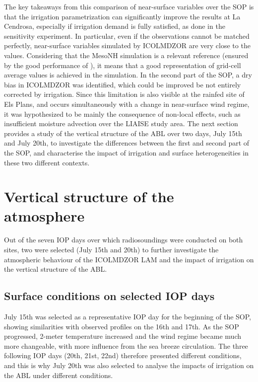 The key takeaways from this comparison of near-surface variables over the SOP is that the irrigation parametrization can significantly improve the results at La Cendrosa, especially if irrigation demand is fully satisfied, as done in the \irrboost sensitivity experiment.
In particular, even if the observations cannot be matched perfectly, near-surface variables simulated by ICOLMDZOR are very close to the \mesomean values. Considering that the MesoNH simulation is a relevant reference (ensured by the good performance of \mesoexact), it means that a good representation of grid-cell average values is achieved in the \irrboost simulation. 
In the second part of the SOP, a dry bias in ICOLMDZOR was identified, which could be improved be not entirely corrected by irrigation. Since this limitation is also visible at the rainfed site of Els Plans, and occurs simultaneously with a change in near-surface wind regime, it was hypothesized to be mainly the consequence of non-local effects, such as insufficient moisture advection over the LIAISE study area. The next section provides a study of the vertical structure of the ABL over two days, July 15th and July 20th, to investigate the differences between the first and second part of the SOP, and characterise the impact of irrigation and surface heterogeneities in these two different contexts.
\clearpage %

\section{Vertical structure of the atmosphere}
\label{sec:iop}

Out of the seven IOP days over which radiosoundings were conducted on both sites, two were selected (July 15th and 20th) to further investigate the atmospheric behaviour of the ICOLMDZOR LAM and the impact of irrigation on the vertical structure of the ABL.

\subsection{Surface conditions on selected IOP days}

July 15th was selected as a representative IOP day for the beginning of the SOP, showing similarities with observed profiles on the 16th and 17th. As the SOP progressed, 2-meter temperature increased and the wind regime became much more changeable, with more influence from the sea breeze circulation.
The three following IOP days (20th, 21st, 22nd) therefore presented different conditions, and this is why July 20th was also selected to analyse the impacts of irrigation on the ABL under different conditions.

